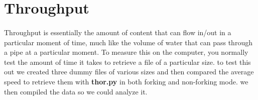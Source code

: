 \documentclass{article}
\begin{document}
\section{Throughput}

\paragraph{}

Throughput is essentially the amount of content that can flow in/out in a particular moment of time, much like the volume of water that can pass through a pipe at a particular moment.  To measure this on the computer, you normally test the amount of time it takes to retrieve a file of a particular size.  to test this out we created three dummy files of various sizes and then compared the average speed to retrieve them with \textbf{thor.py} in both forking and non-forking mode.  we then compiled the data so we could analyze it. 
\end{document}
